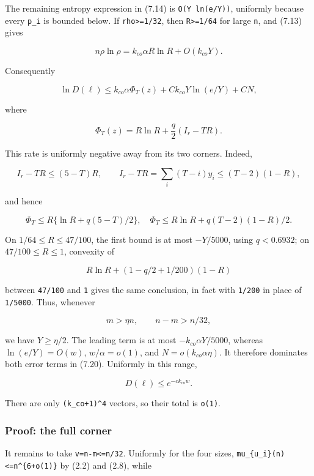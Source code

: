 \documentclass[
  11pt,
  a4paper,
]{article}
\begin{document}
The remaining entropy expression in (7.14) is \texttt{O(Y\ ln(e/Y))},
uniformly because every \texttt{p\_i} is bounded below. If
\texttt{rho\textgreater{}=1/32}, then \texttt{R\textgreater{}=1/64} for
large \texttt{n}, and (7.13) gives

\[
 n\rho\ln\rho=k_{co}\alpha R\ln R+O(k_{co}Y).           \tag{7.19}
\]

Consequently

\[
 \ln D(\ell)
 \le k_{co}\alpha\Phi_T(z)
     +Ck_{co}Y\ln(e/Y)+CN,                               \tag{7.20}
\]

where

\[
 \Phi_T(z)=R\ln R+\frac q2(I_r-TR).                     \tag{7.21}
\]

This rate is uniformly negative away from its two corners. Indeed,

\[
 I_r-TR\le(5-T)R,\qquad
 I_r-TR=\sum_i(T-i)y_i\le(T-2)(1-R),                    \tag{7.22}
\]

and hence

\[
 \Phi_T\le R\{\ln R+q(5-T)/2\},
 \quad
 \Phi_T\le R\ln R+q(T-2)(1-R)/2.                       \tag{7.23}
\]

On \(1/64\le R\le47/100\), the first bound is at most \(-Y/5000\), using
\(q<0.6932\); on \(47/100\le R\le1\), convexity of

\[
 R\ln R+(1-q/2+1/200)(1-R)
\]

between \texttt{47/100} and \texttt{1} gives the same conclusion, in
fact with \texttt{1/200} in place of \texttt{1/5000}. Thus, whenever

\[
 m>\eta n,\qquad n-m>n/32,                               \tag{7.24}
\]

we have \(Y\ge\eta/2\). The leading term is at most
\(-k_{co}\alpha Y/5000\), whereas \(\ln(e/Y)=O(w)\), \(w/\alpha=o(1)\),
and \(N=o(k_{co}\alpha\eta)\). It therefore dominates both error terms
in (7.20). Uniformly in this range,

\[
 D(\ell)\le e^{-c k_{co}w}.                              \tag{7.25}
\]

There are only \texttt{(k\_co+1)\^{}4} vectors, so their total is
\texttt{o(1)}.

\subsubsection{Proof: the full corner}\label{proof-the-full-corner}

It remains to take \texttt{v=n-m\textless{}=n/32}. Uniformly for the
four sizes,
\texttt{mu\_}\allowbreak{}\texttt{\{u\_}\allowbreak{}\texttt{i\}(n)}\allowbreak{}\texttt{\textless{}}\allowbreak{}\texttt{=}\allowbreak{}\texttt{n\^{}\{6+}\allowbreak{}\texttt{o(1)}\allowbreak{}\texttt{\}}
by (2.2) and (2.8), while
\end{document}
